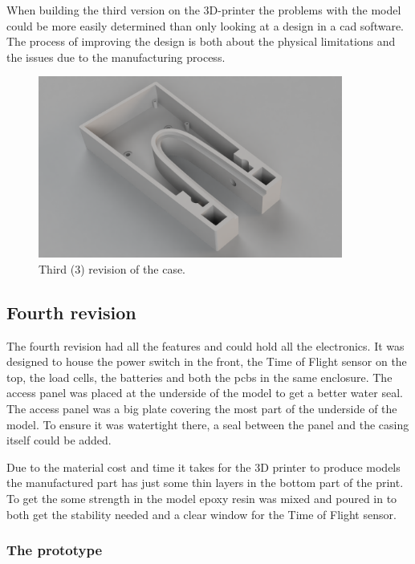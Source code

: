 When building the third version on the 3D-printer the problems with the model could be more easily determined than only looking at a design in a \gls{cad} software. The process of improving the design is both about the physical limitations and the issues  due to the manufacturing process.


\begin{figure}[H]
\begin{center}
	\includegraphics[width = 10cm]{Figures/Case_rev_3.png}
	\caption{Third (3) revision of the case.}
	\label{Case_rev_2}
\end{center}
\end{figure}

\subsection{Fourth revision}

The fourth revision had all the features and could hold all the electronics. It was designed to house the power switch in the front, the Time of Flight sensor on the top, the load cells, the batteries and both the \gls{pcb}s in the same enclosure. The access panel was placed at the underside of the model to get a better water seal. The access panel was a big plate covering the most part of the underside of the model. To ensure it was watertight there, a seal between the panel and the casing itself could be added.

Due to the material cost and time it takes for the 3D printer to produce models the manufactured part has just some thin layers in the bottom part of the print. To get the some strength in the model epoxy resin was mixed and poured in to both get the stability needed and a clear window for the Time of Flight sensor.

\subsubsection{The prototype}


